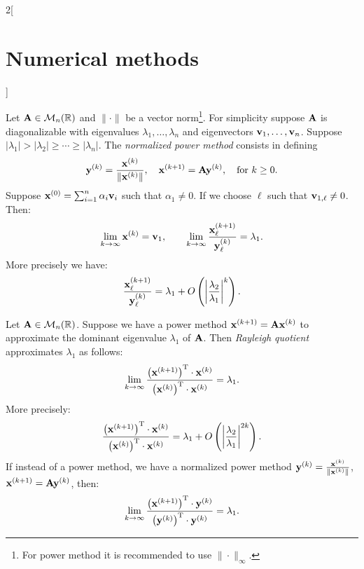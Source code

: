 \documentclass[../../../main.tex]{subfiles}
\begin{document}
\begin{multicols}{2}[\section{Numerical methods}]
\begin{method}
\end{method}
\begin{method}
    Let $\vb{A}\in\mathcal{M}_n(\mathbb{R})$ and $\|\cdot\|$ be a vector norm\footnote{For power method it is recommended to use $\|\cdot\|_\infty$.}. For simplicity suppose $\vb{A}$ is diagonalizable with eigenvalues $\lambda_1,\ldots,\lambda_n$ and eigenvectors $\vb{v}_1,\ldots,\vb{v}_n$. Suppose $|\lambda_1|>|\lambda_2|\geq\cdots\geq|\lambda_n|$. The \textit{normalized power method} consists in defining $$\vb{y}^{(k)}=\frac{\vb{x}^{(k)}}{\|\vb{x}^{(k)}\|},\quad\vb{x}^{(k+1)}=\vb{A}\vb{y}^{(k)},\quad\text{for }k\geq 0.$$ Suppose $\vb{x}^{(0)}=\sum_{i=1}^n\alpha_i\vb{v}_i$ such that $\alpha_1\ne0$. If we choose $\ell$ such that $\vb{v}_{1,\ell}\ne0$. Then: $$\lim_{k\to\infty}\vb{x}^{(k)}=\vb{v}_1,\qquad\lim_{k\to\infty}\frac{\vb{x}_\ell^{(k+1)}}{\vb{y}_\ell^{(k)}}=\lambda_1.$$ More precisely we have: $$\frac{\vb{x}_\ell^{(k+1)}}{\vb{y}_\ell^{(k)}}=\lambda_1+O\left(\left|\frac{\lambda_2}{\lambda_1}\right|^k\right).$$
\end{method}
\begin{method}
    Let $\vb{A}\in\mathcal{M}_n(\mathbb{R})$. Suppose we have a power method $\vb{x}^{(k+1)}=\vb{A}\vb{x}^{(k)}$ to approximate the dominant eigenvalue $\lambda_1$ of $\vb{A}$. Then \textit{Rayleigh quotient} approximates $\lambda_1$ as follows: $$\lim_{k\to\infty}\frac{\left(\vb{x}^{(k+1)}\right)^\mathrm{T}\cdot \vb{x}^{(k)}}{\left(\vb{x}^{(k)}\right)^\mathrm{T}\cdot\vb{x}^{(k)}}=\lambda_1.$$
    More precisely: $$\frac{\left(\vb{x}^{(k+1)}\right)^\mathrm{T}\cdot \vb{x}^{(k)}}{\left(\vb{x}^{(k)}\right)^\mathrm{T}\cdot\vb{x}^{(k)}}=\lambda_1+O\left(\left|\frac{\lambda_2}{\lambda_1}\right|^{2k}\right).$$ If instead of a power method, we have a normalized power method $\vb{y}^{(k)}=\frac{\vb{x}^{(k)}}{\|\vb{x}^{(k)}\|}$, $\vb{x}^{(k+1)}=\vb{A}\vb{y}^{(k)}$, then: $$\lim_{k\to\infty}\frac{\left(\vb{x}^{(k+1)}\right)^\mathrm{T}\cdot \vb{y}^{(k)}}{\left(\vb{y}^{(k)}\right)^\mathrm{T}\cdot\vb{y}^{(k)}}=\lambda_1.$$
\end{method}
\begin{method}

\end{method}
\end{multicols}
\end{document}
